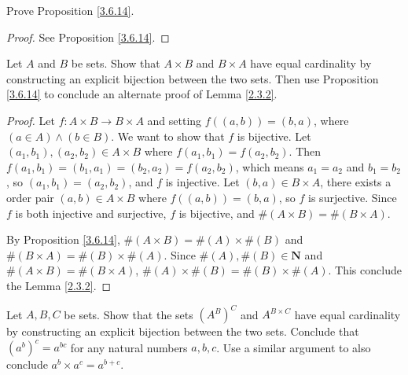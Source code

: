 \begin{exercise}\label{ex 3.6.4}
    Prove Proposition \ref{3.6.14}.
\end{exercise}

\begin{proof}
    See Proposition \ref{3.6.14}.
\end{proof}

\begin{exercise}\label{ex 3.6.5}
    Let \(A\) and \(B\) be sets.
    Show that \(A \times B\) and \(B \times A\) have equal cardinality by constructing an explicit bijection between the two sets.
    Then use Proposition \ref{3.6.14} to conclude an alternate proof of Lemma \ref{2.3.2}.
\end{exercise}

\begin{proof}
    Let \(f : A \times B \to B \times A\) and setting \(f((a, b)) = (b, a)\), where \((a \in A) \land (b \in B)\).
    We want to show that \(f\) is bijective.
    Let \((a_1, b_1), (a_2, b_2) \in A \times B\) where \(f(a_1, b_1) = f(a_2, b_2)\).
    Then \(f(a_1, b_1) = (b_1, a_1) = (b_2, a_2) = f(a_2, b_2)\), which means \(a_1 = a_2\) and \(b_1 = b_2\), so \((a_1, b_1) = (a_2, b_2)\), and \(f\) is injective.
    Let \((b, a) \in B \times A\), there exists a order pair \((a, b) \in A \times B\) where \(f((a, b)) = (b, a)\), so \(f\) is surjective.
    Since \(f\) is both injective and surjective, \(f\) is bijective, and \(\#(A \times B) = \#(B \times A)\).

    By Proposition \ref{3.6.14}, \(\#(A \times B) = \#(A) \times \#(B)\) and \(\#(B \times A) = \#(B) \times \#(A)\).
    Since \(\#(A), \#(B) \in \mathbf{N}\) and \(\#(A \times B) = \#(B \times A)\), \(\#(A) \times \#(B) = \#(B) \times \#(A)\).
    This conclude the Lemma \ref{2.3.2}.
\end{proof}

\begin{exercise}\label{ex 3.6.6}
    Let \(A, B, C\) be sets.
    Show that the sets \((A^B)^C\) and \(A^{B \times C}\) have equal cardinality by constructing an explicit bijection between the two sets.
    Conclude that \((a^b)^c = a^{bc}\) for any natural numbers \(a, b, c\).
    Use a similar argument to also conclude \(a^b \times a^c = a^{b+c}\).
\end{exercise}

